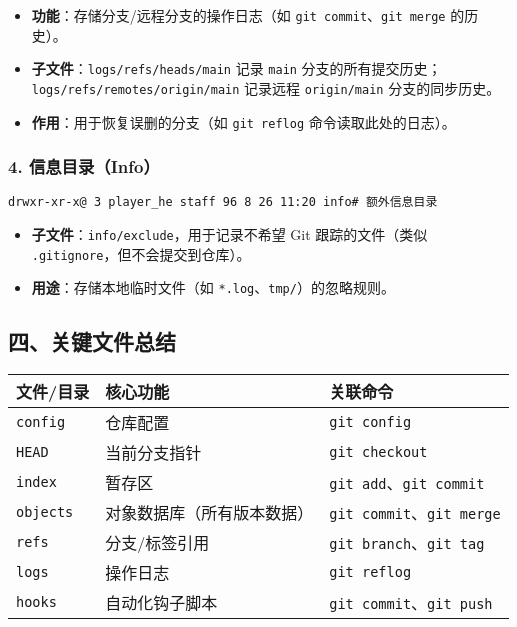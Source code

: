 \begin{itemize}[leftmargin=*, nosep]
    \item \textbf{功能}：存储分支/远程分支的操作日志（如 \texttt{git commit}、\texttt{git merge} 的历史）。
    \item \textbf{子文件}：\texttt{logs/refs/heads/main} 记录 \texttt{main} 分支的所有提交历史；\texttt{logs/refs/remotes/origin/main} 记录远程 \texttt{origin/main} 分支的同步历史。
    \item \textbf{作用}：用于恢复误删的分支（如 \texttt{git reflog} 命令读取此处的日志）。
\end{itemize}

\subsubsection{4. 信息目录（Info）}
\begin{verbatim}
drwxr-xr-x@ 3 player_he staff 96 8 26 11:20 info# 额外信息目录
\end{verbatim}

\begin{itemize}[leftmargin=*, nosep]
    \item \textbf{子文件}：\texttt{info/exclude}，用于记录不希望 Git 跟踪的文件（类似 \texttt{.gitignore}，但不会提交到仓库）。
    \item \textbf{用途}：存储本地临时文件（如 \texttt{*.log}、\texttt{tmp/}）的忽略规则。
\end{itemize}


\subsection{四、关键文件总结}
\begin{center}
\begin{tabular}{@{}lll@{}}
\toprule
文件/目录       & 核心功能                              & 关联命令                \\
\midrule
\texttt{config} & 仓库配置                              & \texttt{git config}     \\
\texttt{HEAD}   & 当前分支指针                          & \texttt{git checkout}   \\
\texttt{index}  & 暂存区                                & \texttt{git add}、\texttt{git commit} \\
\texttt{objects} & 对象数据库（所有版本数据）            & \texttt{git commit}、\texttt{git merge} \\
\texttt{refs}   & 分支/标签引用                          & \texttt{git branch}、\texttt{git tag} \\
\texttt{logs}   & 操作日志                              & \texttt{git reflog}     \\
\texttt{hooks}  & 自动化钩子脚本                        & \texttt{git commit}、\texttt{git push} \\
\bottomrule
\end{tabular}
\end{center}


